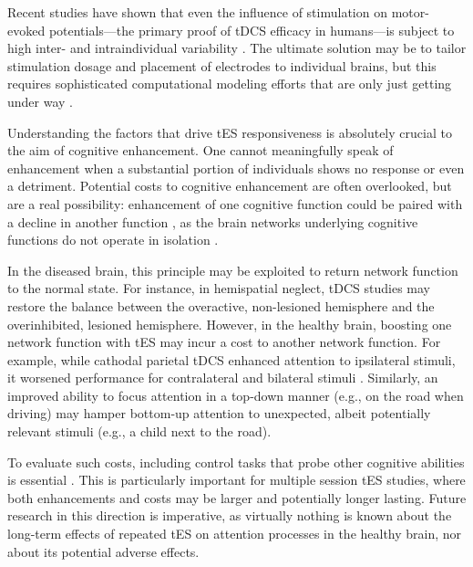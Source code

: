 \documentclass[11pt,]{memoir}
\begin{document}
Recent studies have shown that even the influence of stimulation on motor-evoked potentials---the primary proof of tDCS efficacy in humans---is subject to high inter- \autocites{Lopez-Alonso2014}{Strube2016}{Wiethoff2014} and intraindividual variability \autocites{Dyke2016}{Lopez-Alonso2015}{Horvath2015b}. The ultimate solution may be to tailor stimulation dosage and placement of electrodes to individual brains, but this requires sophisticated computational modeling efforts that are only just getting under way \autocites{DeBerker2013}{Bikson2012}.

Understanding the factors that drive tES responsiveness is absolutely crucial to the aim of cognitive enhancement. One cannot meaningfully speak of enhancement when a substantial portion of individuals shows no response or even a detriment. Potential costs to cognitive enhancement are often overlooked, but are a real possibility: enhancement of one cognitive function could be paired with a decline in another function \autocites{Brem2014a}{Iuculano2013}{Sarkar2014}, as the brain networks underlying cognitive functions do not operate in isolation \autocite{Wokke2015}.

In the diseased brain, this principle may be exploited to return network function to the normal state. For instance, in hemispatial neglect, tDCS studies may restore the balance between the overactive, non-lesioned hemisphere and the overinhibited, lesioned hemisphere. However, in the healthy brain, boosting one network function with tES may incur a cost to another network function. For example, while cathodal parietal tDCS enhanced attention to ipsilateral stimuli, it worsened performance for contralateral and bilateral stimuli \autocites{Filmer2015}{Sparing2009}. Similarly, an improved ability to focus attention in a top-down manner (e.g., on the road when driving) may hamper bottom-up attention to unexpected, albeit potentially relevant stimuli (e.g., a child next to the road).

To evaluate such costs, including control tasks that probe other cognitive abilities is essential \autocites{Wokke2015}{Parkin2015}. This is particularly important for multiple session tES studies, where both enhancements and costs may be larger and potentially longer lasting. Future research in this direction is imperative, as virtually nothing is known about the long-term effects of repeated tES on attention processes in the healthy brain, nor about its potential adverse effects.
\end{document}

